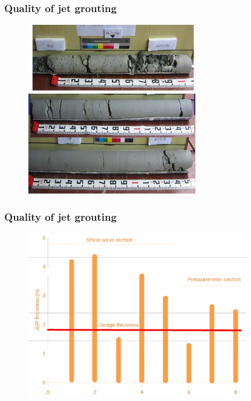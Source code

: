 \documentclass[notes]{beamer}
\begin{document}
\begin{frame}
\frametitle{Quality of jet grouting}
\begin{figure}[ht]
	\centering
	\includegraphics[width=0.65\textwidth]{figs/jet-grout-cores.png}
\end{figure}
\end{frame}

\begin{frame}
\frametitle{Quality of jet grouting}
\begin{figure}[ht]
	\centering
	\includegraphics[width=0.85\textwidth]{figs/jet-grout-thickness.png}
\end{figure}
\end{frame}
\end{document}
